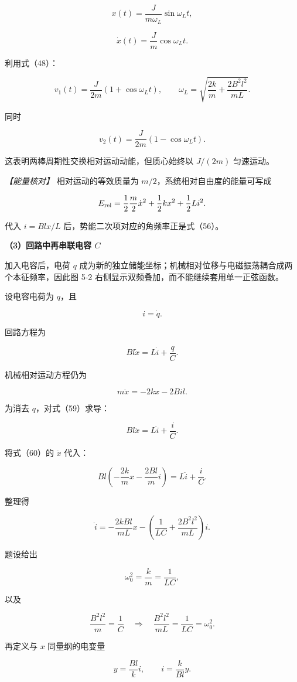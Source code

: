 \documentclass[12pt,a4paper,UTF8]{ctexart}
\begin{document}
\[x(t)=\frac{J}{m\omega_L}\sin\omega_Lt,\]

\[\dot x(t)=\frac Jm\cos\omega_Lt. \tag{57}\]

利用式（48）：

\[\boxed{
v_1(t)=\frac{J}{2m}\left(1+\cos\omega_Lt\right),
\qquad
\omega_L=\sqrt{\frac{2k}{m}+\frac{2B^2l^2}{mL}}
}. \tag{58}\]

同时

\[v_2(t)=\frac{J}{2m}\left(1-\cos\omega_Lt\right).\]

这表明两棒周期性交换相对运动动能，但质心始终以 \(J/(2m)\) 匀速运动。

\emph{【能量核对】} 相对运动的等效质量为
\(m/2\)，系统相对自由度的能量可写成

\[E_{\rm rel}=\frac12\frac m2\dot x^2+\frac12kx^2+\frac12Li^2.\]

代入 \(i=Blx/L\) 后，势能二次项对应的角频率正是式（56）。

\textbf{（3）回路中再串联电容 \(C\)}

加入电容后，电荷 \(q\)
成为新的独立储能坐标；机械相对位移与电磁振荡耦合成两个本征频率，因此图
5-2 右侧显示双频叠加，而不能继续套用单一正弦函数。

设电容电荷为 \(q\)，且

\[i=\dot q.\]

回路方程为

\[Bl\dot x=L\dot i+\frac qC. \tag{59}\]

机械相对运动方程仍为

\[m\ddot x=-2kx-2Bil. \tag{60}\]

为消去 \(q\)，对式（59）求导：

\[Bl\ddot x=L\ddot i+\frac iC.\]

将式（60）的 \(\ddot x\) 代入：

\[Bl\left(-\frac{2k}{m}x-\frac{2Bl}{m}i\right)
=L\ddot i+\frac iC.\]

整理得

\[\ddot i
=-\frac{2kBl}{mL}x
-\left(\frac1{LC}+\frac{2B^2l^2}{mL}\right)i. \tag{61}\]

题设给出

\[\omega_0^2=\frac{k}{m}=\frac1{LC},\]

以及

\[\frac{B^2l^2}{m}=\frac1C
\quad\Longrightarrow\quad
\frac{B^2l^2}{mL}=\frac1{LC}=\omega_0^2. \tag{62}\]

再定义与 \(x\) 同量纲的电变量

\[y=\frac{Bl}{k}i,
\qquad i=\frac{k}{Bl}y. \tag{63}\]
\end{document}
